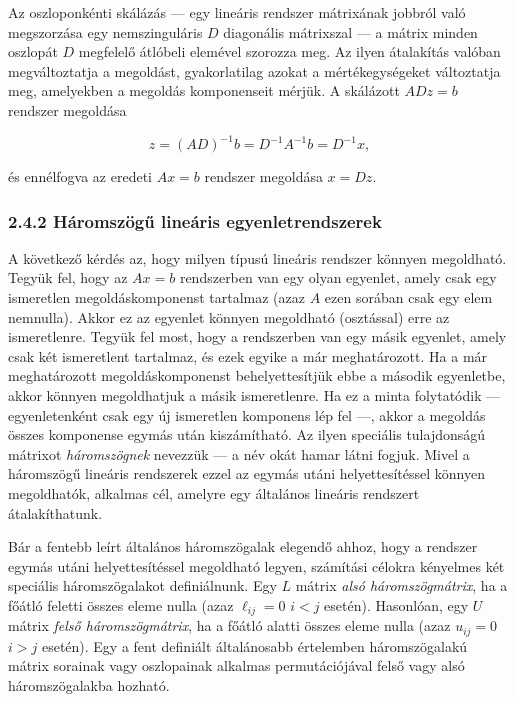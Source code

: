 \documentclass[
  magyar,
  11pt]{article}
\begin{document}
Az oszloponkénti skálázás --- egy lineáris rendszer mátrixának jobbról
való megszorzása egy nemszinguláris \(D\) diagonális mátrixszal --- a
mátrix minden oszlopát \(D\) megfelelő átlóbeli elemével szorozza meg.
Az ilyen átalakítás valóban megváltoztatja a megoldást, gyakorlatilag
azokat a mértékegységeket változtatja meg, amelyekben a megoldás
komponenseit mérjük. A skálázott \(ADz = b\) rendszer megoldása

\[z = (AD)^{-1}b = D^{-1}A^{-1}b = D^{-1}x,\]

és ennélfogva az eredeti \(Ax = b\) rendszer megoldása \(x = Dz\).

\subsubsection{2.4.2 Háromszögű lineáris
egyenletrendszerek}\label{huxe1romszuxf6gux171-lineuxe1ris-egyenletrendszerek}

A következő kérdés az, hogy milyen típusú lineáris rendszer könnyen
megoldható. Tegyük fel, hogy az \(Ax = b\) rendszerben van egy olyan
egyenlet, amely csak egy ismeretlen megoldáskomponenst tartalmaz (azaz
\(A\) ezen sorában csak egy elem nemnulla). Akkor ez az egyenlet könnyen
megoldható (osztással) erre az ismeretlenre. Tegyük fel most, hogy a
rendszerben van egy másik egyenlet, amely csak két ismeretlent
tartalmaz, és ezek egyike a már meghatározott. Ha a már meghatározott
megoldáskomponenst behelyettesítjük ebbe a második egyenletbe, akkor
könnyen megoldhatjuk a másik ismeretlenre. Ha ez a minta folytatódik ---
egyenletenként csak egy új ismeretlen komponens lép fel ---, akkor a
megoldás összes komponense egymás után kiszámítható. Az ilyen speciális
tulajdonságú mátrixot \emph{háromszögnek} nevezzük --- a név okát hamar
látni fogjuk. Mivel a háromszögű lineáris rendszerek ezzel az egymás
utáni helyettesítéssel könnyen megoldhatók, alkalmas cél, amelyre egy
általános lineáris rendszert átalakíthatunk.

Bár a fentebb leírt általános háromszögalak elegendő ahhoz, hogy a
rendszer egymás utáni helyettesítéssel megoldható legyen, számítási
célokra kényelmes két speciális háromszögalakot definiálnunk. Egy \(L\)
mátrix \emph{alsó háromszögmátrix}, ha a főátló feletti összes eleme
nulla (azaz \(\ell_{ij} = 0\) \(i < j\) esetén). Hasonlóan, egy \(U\)
mátrix \emph{felső háromszögmátrix}, ha a főátló alatti összes eleme
nulla (azaz \(u_{ij} = 0\) \(i > j\) esetén). Egy a fent definiált
általánosabb értelemben háromszögalakú mátrix sorainak vagy oszlopainak
alkalmas permutációjával felső vagy alsó háromszögalakba hozható.
\end{document}
